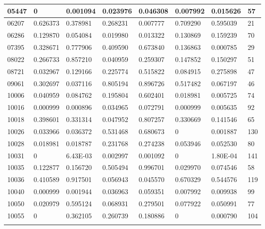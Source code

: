 \begin{table}[H]
{\begin{tabular}{|l|l|l|l|l|l|l|l|}
				05447 & {\color{red}0}        & {\color{red}0.001094} & {\color{red}0.023976} & {\color{red}0.046308} & {\color{red}0.007992} & {\color{red}0.015626} & 57 \\ \hline
				06207 & 0.626373 & 0.378981 & 0.268231 & {\color{red}0.007777} & 0.709290 & 0.595039 & 21 \\ \hline
				06286 & 0.129870 & 0.054084 & {\color{red}0.019980} & {\color{red}0.013322} & 0.130869 & 0.159239 & 70 \\ \hline
				07395 & 0.328671 & 0.777906 & 0.409590 & 0.673840 & 0.136863 & {\color{red}0.000785} & 29 \\ \hline
				08022 & 0.266733 & 0.857210 & {\color{red}0.040959} & 0.259307 & 0.147852 & 0.150297 & 51 \\ \hline
				08721 & {\color{red}0.032967} & 0.129166 & 0.225774 & 0.515822 & 0.084915 & 0.275898 & 47 \\ \hline
				09061 & 0.302697 & {\color{red}0.037116} & 0.805194 & 0.896726 & 0.517482 & 0.067197 & 46 \\ \hline
				10006 & {\color{red}0.040959} & 0.084762 & 0.195804 & 0.602401 & {\color{red}0.018981} & {\color{red}0.005725} & 74 \\ \hline
				10016 & {\color{red}0.000999} & {\color{red}0.000896} & {\color{red}0.034965} & 0.072791 & {\color{red}0.000999} & {\color{red}0.005635} & 92 \\ \hline
				10018 & 0.398601 & 0.331314 & {\color{red}0.047952} & 0.807257 & 0.330669 & 0.141546 & 65 \\ \hline
				10026 & {\color{red}0.033966} & {\color{red}0.036372} & 0.531468 & 0.680673 & {\color{red}0}        & {\color{red}0.001887} & 130 \\ \hline
				10028 & {\color{red}0.018981} & {\color{red}0.018787} & 0.231768 & 0.274238 & 0.053946 & 0.052530 & 80 \\ \hline
				10031 & {\color{red}0}        & {\color{red}6.43E-03} & {\color{red}0.002997} & {\color{red}0.001092} & {\color{red}0}        & {\color{red}1.80E-04} & 141 \\ \hline
				10035 & 0.122877 & 0.156720 & 0.505494 & 0.996701 & {\color{red}0.029970} & 0.074546 & 58 \\ \hline
				10036 & 0.410589 & 0.917501 & 0.056943 & {\color{red}0.045570} & 0.670329 & 0.544576 & 119 \\ \hline
				10040 & {\color{red}0.000999} & {\color{red}0.001944} & {\color{red}0.036963} & 0.059351 & {\color{red}0.007992} & {\color{red}0.009938} & 99 \\ \hline
				10050 & {\color{red}0.020979} & 0.595124 & 0.068931 & 0.279501 & 0.077922 & 0.050991 & 77 \\ \hline
				10055 & {\color{red}0}        & 0.362105 & 0.260739 & 0.180886 & {\color{red}0}        & {\color{red}0.000790} & 104 \\ \hline

\label{tab:nosocsII}
\end{tabular}
}
\end{table}